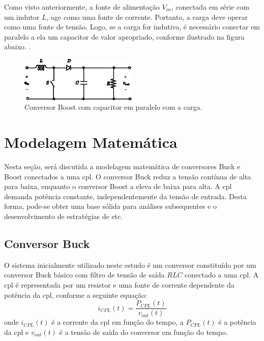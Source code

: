 Como visto anteriormente, a fonte de alimentação $V_{in}$, conectada em série com um indutor $L$, age como uma fonte de corrente. Portanto, a carga deve operar como uma fonte de tensão. Logo, se a carga for indutiva, é necessário conectar em paralelo a ela um capacitor de valor apropriado, conforme ilustrado na figura abaixo. \cite{martins2008}.

\begin{figure}[H]
  \centering
  \includegraphics[width=0.5\textwidth]{figuras/boost_converter_capacitor.eps}
  \caption{Conversor Boost com capacitor em paralelo com a carga.}
  \label{fig:boost_converter_capacitor}
\end{figure}

\section{Modelagem Matemática}

Nesta seção, será discutida a modelagem matemática de conversores Buck e Boost conectados a uma \acrshort{cpl}. O conversor Buck reduz a tensão contínua de alta para baixa, enquanto o conversor Boost a eleva de baixa para alta. A \acrshort{cpl} demanda potência constante, independentemente da tensão de entrada. Desta forma, pode-se obter uma base sólida para análises subsequentes e o desenvolvimento de estratégias de \acrshort{etc}.

\subsection{Conversor Buck}

O sistema inicialmente utilizado neste estudo é um conversor constituído por um conversor Buck básico com filtro de tensão de saída $RLC$ conectado a uma \acrshort{cpl}. A \acrshort{cpl} é representada por um resistor e uma fonte de corrente dependente da potência da \acrshort{cpl}, conforme a seguinte equação: \begin{equation} i_{CPL}(t) = \frac{P_{CPL}(t)}{v_{out}(t)} \label{eq:cpl_current} \end{equation} onde $i_{CPL}(t)$ é a corrente da \acrshort{cpl} em função do tempo, a $P_{CPL}(t)$ é a potência da \acrshort{cpl} e $v_{out}(t)$ é a tensão de saída do conversor em função do tempo.

